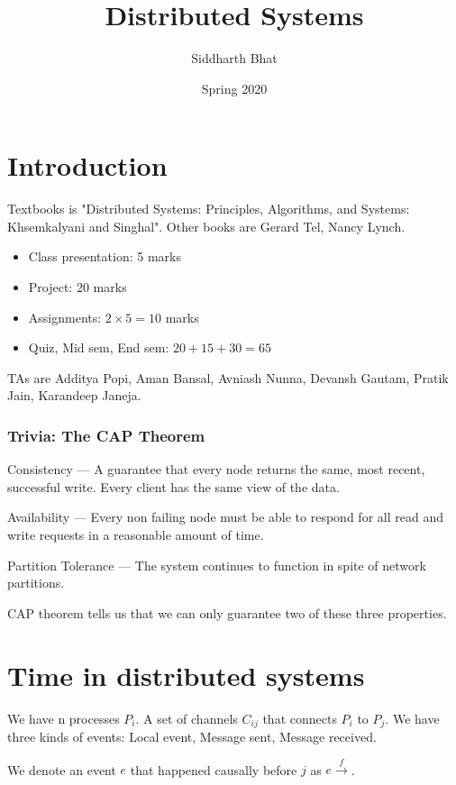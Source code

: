 \documentclass[11pt]{book}
\title{Distributed Systems}
\author{Siddharth Bhat}
\date{Spring 2020}
\begin{document}
\maketitle
\tableofcontents

\chapter{Introduction}
Textbooks is "Distributed Systems: Principles, Algorithms, and Systems:
Khsemkalyani and Singhal". Other books are Gerard Tel, Nancy Lynch.

\begin{itemize}
    \item Class presentation: 5 marks
    \item Project: 20 marks
    \item Assignments: $2 \times 5 = 10$ marks
    \item Quiz, Mid sem, End sem: $20 + 15 + 30 = 65$
\end{itemize}

TAs are Additya Popi, Aman Bansal, Avniash Nunna, Devansh Gautam, Pratik Jain,
Karandeep Janeja.

\subsection{Trivia: The CAP Theorem}

Consistency --- A guarantee that every node returns the same, most recent,
successful write. Every client has the same view of the data.

Availability --- Every non failing node must be able to respond for all read
and write requests in a reasonable amount of time.

Partition Tolerance --- The system continues to function in spite of network
partitions.

CAP theorem tells us that we can only guarantee two of these three properties.

\chapter{Time in distributed systems}


We have n processes $P_i$. A set of channels $C_{ij}$ that connects $P_i$ to
$P_j$.
We have three kinds of events: Local event, Message sent, Message received.

We denote an event $e$ that happened causally before $j$ as $e \xrightarrow f$.
\end{document}
